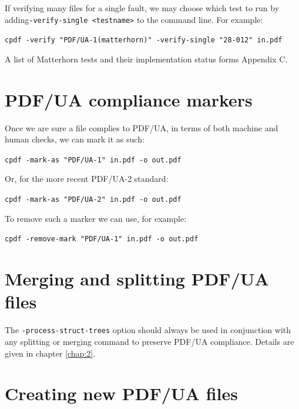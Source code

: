 \documentclass{book}
\begin{document}
\noindent If verifying many files for a single fault, we may choose which test to run by adding\linebreak \texttt{-verify-single <testname>} to the command line. For example:


  \begin{framed}
    \noindent\small\verb!cpdf -verify "PDF/UA-1(matterhorn)" -verify-single "28-012" in.pdf!
  \end{framed}

\noindent A list of Matterhorn tests and their implementation status forms Appendix C.

\section{PDF/UA compliance markers}

Once we are sure a file complies to PDF/UA, in terms of both machine and human checks, we can mark it as such:

  \begin{framed}
    \noindent\small\verb!cpdf -mark-as "PDF/UA-1" in.pdf -o out.pdf!
  \end{framed}

\noindent Or, for the more recent PDF/UA-2 standard:

  \begin{framed}
    \noindent\small\verb!cpdf -mark-as "PDF/UA-2" in.pdf -o out.pdf!
  \end{framed}

\noindent To remove such a marker we can use, for example:

  \begin{framed}
    \noindent\small\verb!cpdf -remove-mark "PDF/UA-1" in.pdf -o out.pdf!
  \end{framed}

\section{Merging and splitting PDF/UA files}

\noindent The \texttt{-process-struct-trees} option should always be used in conjunction with any splitting or merging command to preserve PDF/UA compliance. Details are given in chapter \ref{chap:2}.

\section{Creating new PDF/UA files}
\end{document}
